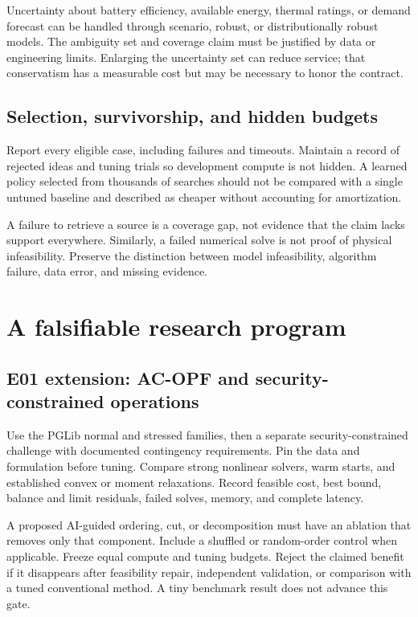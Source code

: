 \documentclass[11pt,letterpaper]{article}
\begin{document}
Uncertainty about battery efficiency, available energy, thermal ratings, or demand forecast can be handled through scenario, robust, or distributionally robust models. The ambiguity set and coverage claim must be justified by data or engineering limits. Enlarging the uncertainty set can reduce service; that conservatism has a measurable cost but may be necessary to honor the contract.

\subsection{Selection, survivorship, and hidden budgets}
Report every eligible case, including failures and timeouts. Maintain a record of rejected ideas and tuning trials so development compute is not hidden. A learned policy selected from thousands of searches should not be compared with a single untuned baseline and described as cheaper without accounting for amortization.

A failure to retrieve a source is a coverage gap, not evidence that the claim lacks support everywhere. Similarly, a failed numerical solve is not proof of physical infeasibility. Preserve the distinction between model infeasibility, algorithm failure, data error, and missing evidence.

\section{A falsifiable research program}
\label{sec:program}
\subsection{E01 extension: AC-OPF and security-constrained operations}
Use the PGLib normal and stressed families, then a separate security-constrained challenge with documented contingency requirements. Pin the data and formulation before tuning. Compare strong nonlinear solvers, warm starts, and established convex or moment relaxations. Record feasible cost, best bound, balance and limit residuals, failed solves, memory, and complete latency.

A proposed AI-guided ordering, cut, or decomposition must have an ablation that removes only that component. Include a shuffled or random-order control when applicable. Freeze equal compute and tuning budgets. Reject the claimed benefit if it disappears after feasibility repair, independent validation, or comparison with a tuned conventional method. A tiny benchmark result does not advance this gate.
\end{document}
